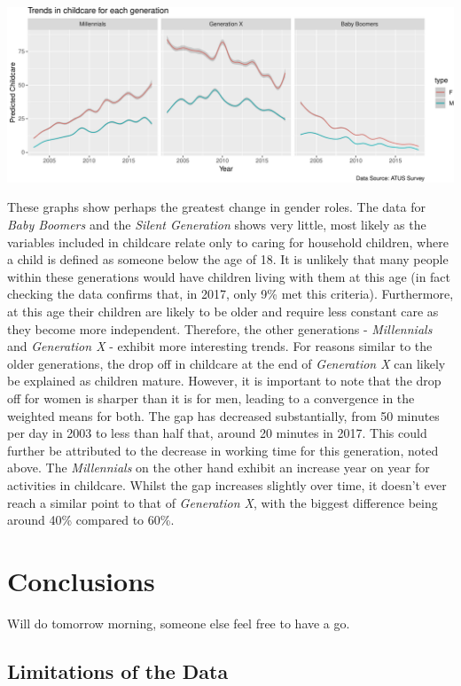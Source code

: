 \documentclass[11pt,]{article}
\begin{document}
\includegraphics{Final-Report_files/figure-latex/unnamed-chunk-7-1}

These graphs show perhaps the greatest change in gender roles. The data
for \emph{Baby Boomers} and the \emph{Silent Generation} shows very
little, most likely as the variables included in childcare relate only
to caring for household children, where a child is defined as someone
below the age of 18. It is unlikely that many people within these
generations would have children living with them at this age (in fact
checking the data confirms that, in 2017, only 9\% met this criteria).
Furthermore, at this age their children are likely to be older and
require less constant care as they become more independent. Therefore,
the other generations - \emph{Millennials} and \emph{Generation X} -
exhibit more interesting trends. For reasons similar to the older
generations, the drop off in childcare at the end of \emph{Generation X}
can likely be explained as children mature. However, it is important to
note that the drop off for women is sharper than it is for men, leading
to a convergence in the weighted means for both. The gap has decreased
substantially, from 50 minutes per day in 2003 to less than half that,
around 20 minutes in 2017. This could further be attributed to the
decrease in working time for this generation, noted above. The
\emph{Millennials} on the other hand exhibit an increase year on year
for activities in childcare. Whilst the gap increases slightly over
time, it doesn't ever reach a similar point to that of \emph{Generation
X}, with the biggest difference being around 40\% compared to 60\%.

\hypertarget{conclusions}{%
\section{Conclusions}\label{conclusions}}

Will do tomorrow morning, someone else feel free to have a go.

\hypertarget{limitations-of-the-data}{%
\subsection{Limitations of the Data}\label{limitations-of-the-data}}
\end{document}

